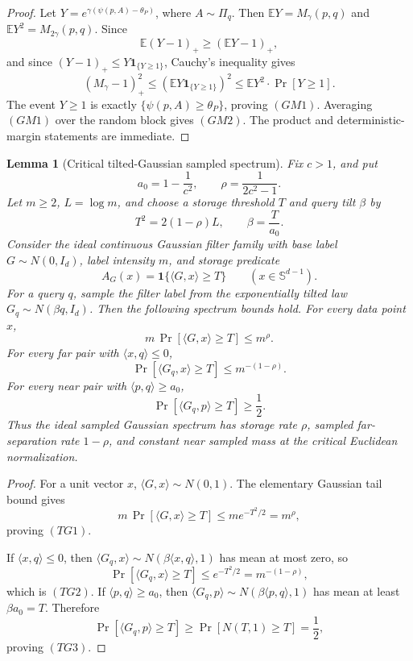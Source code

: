 \documentclass[10pt]{article}
\newtheorem{lemma}[theorem]{Lemma}
\theoremstyle{definition}
\newcommand{\E}{\mathbb{E}}
\newcommand{\ip}[2]{\langle #1,#2\rangle}
\begin{document}
\begin{proof}
   Let \(Y=e^{\gamma(\psi(p,A)-\theta_P)}\), where
   \(A\sim\Pi_q\).  Then \(\E Y=M_\gamma(p,q)\) and
   \(\E Y^2=M_{2\gamma}(p,q)\).  Since
   \[
      \E(Y-1)_+\ge(\E Y-1)_+,
   \]
   and since \((Y-1)_+\le Y\mathbf 1_{\{Y\ge1\}}\), Cauchy's inequality gives
   \[
      (M_\gamma-1)_+^2
      \le
      \left(\E Y\mathbf 1_{\{Y\ge1\}}\right)^2
      \le
      \E Y^2\cdot \Pr[Y\ge1].
   \]
   The event \(Y\ge1\) is exactly
   \(\{\psi(p,A)\ge\theta_P\}\), proving \((GM1)\).  Averaging \((GM1)\) over
   the random block gives \((GM2)\).  The product and deterministic-margin
   statements are immediate.
\end{proof}

\begin{lemma}[Critical tilted-Gaussian sampled spectrum]
   \label{lem:critical-tilted-gaussian-sampled-spectrum}
   Fix \(c>1\), and put
   \[
      a_0=1-\frac1{c^2},
      \qquad
      \rho=\frac1{2c^2-1}.
   \]
   Let \(m\ge2\), \(L=\log m\), and choose a storage threshold \(T\) and query
   tilt \(\beta\) by
   \[
      T^2=2(1-\rho)L,
      \qquad
      \beta=\frac{T}{a_0}.
   \]
   Consider the ideal continuous Gaussian filter family with base label
   \(G\sim N(0,I_d)\), label intensity \(m\), and storage predicate
   \[
      A_G(x)=\mathbf 1\{\ip{G}{x}\ge T\}
      \qquad(x\in\mathbb S^{d-1}).
   \]
   For a query \(q\), sample the filter label from the exponentially tilted
   law \(G_q\sim N(\beta q,I_d)\).  Then the following spectrum bounds hold.
   For every data point \(x\),
   \[
      m\,\Pr[\ip{G}{x}\ge T]\le m^\rho.
      \tag{TG1}
   \]
   For every far pair with \(\ip{x}{q}\le0\),
   \[
      \Pr[\ip{G_q}{x}\ge T]\le m^{-(1-\rho)}.
      \tag{TG2}
   \]
   For every near pair with \(\ip{p}{q}\ge a_0\),
   \[
      \Pr[\ip{G_q}{p}\ge T]\ge\frac12.
      \tag{TG3}
   \]
   Thus the ideal sampled Gaussian spectrum has storage rate \(\rho\), sampled
   far-separation rate \(1-\rho\), and constant near sampled mass at the
   critical Euclidean normalization.
\end{lemma}

\begin{proof}
   For a unit vector \(x\), \(\ip{G}{x}\sim N(0,1)\).  The elementary Gaussian
   tail bound gives
   \[
      m\,\Pr[\ip{G}{x}\ge T]
      \le m e^{-T^2/2}
      =
      m^\rho,
   \]
   proving \((TG1)\).

   If \(\ip{x}{q}\le0\), then
   \(\ip{G_q}{x}\sim N(\beta\ip{x}{q},1)\) has mean at most zero, so
   \[
      \Pr[\ip{G_q}{x}\ge T]\le e^{-T^2/2}=m^{-(1-\rho)},
   \]
   which is \((TG2)\).  If \(\ip{p}{q}\ge a_0\), then
   \(\ip{G_q}{p}\sim N(\beta\ip{p}{q},1)\) has mean at least
   \(\beta a_0=T\).  Therefore
   \[
      \Pr[\ip{G_q}{p}\ge T]\ge \Pr[N(T,1)\ge T]=\frac12,
   \]
   proving \((TG3)\).
\end{proof}
\end{document}
